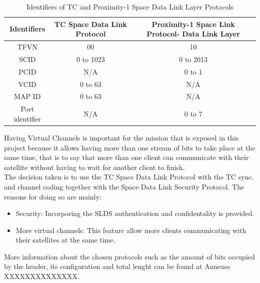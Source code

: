 \begin{table}[H]
\begin{center}
\begin{tabular}{|c|c|c|}
\hline
Identifiers&TC Space Data Link Protocol&Proximity-1 Space Link Protocol- Data Link Layer\\
\hline
TFVN&00&10\\
\hline
SCID&0 to 1023&0 to 2013\\
\hline
PCID&N/A&0 to 1\\
\hline
VCID&0 to 63&N/A\\
\hline
MAP ID&0 to 63&N/A\\
\hline
Port identifier&N/A&0 to 7\\
\hline
\end{tabular}
\caption{Identifiers of TC and Proximity-1 Space Data Link Layer Protocols}
\end{center}
\end{table} 
Having Virtual Channels is important for the mission that is exposed in this project because it allows having more than one stream of bits to take place at the same time, that is to say that more than one client can communicate with their satellite without having to wait for another client to finish.\\
The decision taken is to use the TC Space Data Link Protocol with the TC sync. and channel coding together with the Space Data Link Security Protocol. The reasons for doing so are mainly:
\begin{itemize}
\item Security: Incorporing the SLDS authentication and confidentality is provided.
\item More virtual channels: This feature allow more clients communicating with their satellites at the same time.
\end{itemize}
More information about the chosen protocols such as the amount of bits occupied by the header, its configuration and total lenght can be found at Annexes XXXXXXXXXXXXXX.

%
% 
%